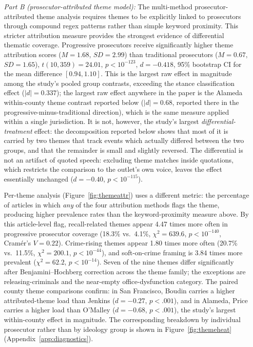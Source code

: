 \documentclass[12pt, letterpaper]{article}
\begin{document}
\emph{Part B (prosecutor-attributed theme model):} The multi-method prosecutor-attributed theme analysis requires themes to be explicitly linked to prosecutors through compound regex patterns rather than simple keyword proximity. This stricter attribution measure provides the strongest evidence of differential thematic coverage. Progressive prosecutors receive significantly higher theme attribution scores ($M = 1.68$, $SD = 2.99$) than traditional prosecutors ($M = 0.67$, $SD = 1.65$), $t(10{,}359) = 24.01$, $p < 10^{-123}$, $d = -0.418$, 95\% bootstrap CI for the mean difference $[0.94, 1.10]$. This is the largest raw effect in magnitude among the study's pooled group contrasts, exceeding the stance classification effect ($|d| = 0.337$); the largest raw effect anywhere in the paper is the Alameda within-county theme contrast reported below ($|d| = 0.68$, reported there in the progressive-minus-traditional direction), which is the same measure applied within a single jurisdiction. It is not, however, the study's largest \emph{differential-treatment} effect: the decomposition reported below shows that most of it is carried by two themes that track events which actually differed between the two groups, and that the remainder is small and slightly reversed. The differential is not an artifact of quoted speech: excluding theme matches inside quotations, which restricts the comparison to the outlet's own voice, leaves the effect essentially unchanged ($d = -0.40$, $p < 10^{-115}$).

Per-theme analysis (Figure~\ref{fig:themeattr}) uses a different metric: the percentage of articles in which \emph{any} of the four attribution methods flags the theme, producing higher prevalence rates than the keyword-proximity measure above. By this article-level flag, recall-related themes appear 4.47 times more often in progressive prosecutor coverage (18.3\% vs.\ 4.1\%, $\chi^2 = 639.6$, $p < 10^{-140}$, Cram\'{e}r's $V = 0.22$). Crime-rising themes appear 1.80 times more often (20.7\% vs.\ 11.5\%, $\chi^2 = 200.1$, $p < 10^{-44}$), and soft-on-crime framing is 3.84 times more prevalent ($\chi^2 = 62.2$, $p < 10^{-14}$). Seven of the nine themes differ significantly after Benjamini--Hochberg correction across the theme family; the exceptions are releasing-criminals and the near-empty office-dysfunction category. The paired county theme comparisons confirm: in San Francisco, Boudin carries a higher attributed-theme load than Jenkins ($d = -0.27$, $p < .001$), and in Alameda, Price carries a higher load than O'Malley ($d = -0.68$, $p < .001$), the study's largest within-county effect in magnitude. The corresponding breakdown by individual prosecutor rather than by ideology group is shown in Figure~\ref{fig:themeheat} (Appendix~\ref{app:diagnostics}).
\end{document}
